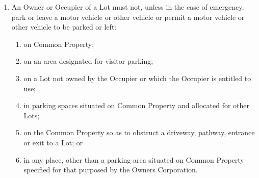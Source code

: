 \documentclass{article}
\begin{document}
\begin{enumerate}[label=\arabic*.]
\begin{enumerate}[label=\arabic{enumi}.\arabic*.]
\begin{enumerate}[label=(\arabic*)]
\begin{enumerate}[label=(\alph*)]
(i) not sub-let any parking space to a person who does not reside within the Development;

\newpage



\item  ensure that its parking space remains free from oil, coolant, grease, fuel, contaminants or other similar substances (rainwater is permissible);

\item  not park or permit a vehicle to be parked, unless in the case of an emergency, in parking spaces which are allocated for your use or on Common Property which would:

(i) obstruct a driveway, pathway, entrance or exit to a Lot or part of a Lot or parking space; or

(ii) be left in any place other than in a parking space, but this sub rule does to prevent an invitee from using a parking space situated on Common Property and specified for use by invitees by the Owners Corporation;

\item  not without prior written consent from the Owners Corporation, enclose your parking space or install a storage case on your parking space.

\end{enumerate}

\item  An Owner or Occupier of a Lot must not, unless in the case of emergency, park or leave a motor vehicle or other vehicle or permit a motor vehicle or other vehicle to be parked or left:

\begin{enumerate}[label=(\alph*)]

\item  on Common Property;

\item  on an area designated for visitor parking;

\item  on a Lot not owned by the Occupier or which the Occupier is entitled to use;

\item  in parking spaces situated on Common Property and allocated for other Lots;

\item  on the Common Property so as to obstruct a driveway, pathway, entrance or exit to a Lot; or

\item  in any place, other than a parking area situated on Common Property specified for that purposed by the Owners Corporation.


\end{enumerate}
\end{enumerate}
\end{enumerate}
\end{enumerate}
\end{document}
